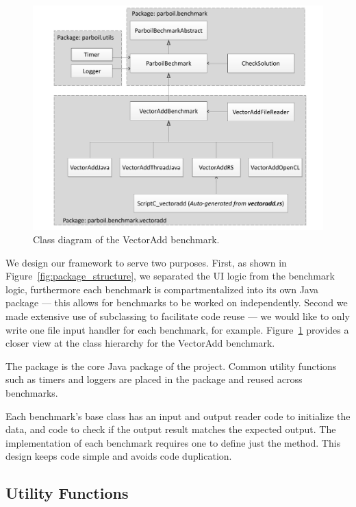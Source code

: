 \begin{figure}
\centering
\includegraphics[scale=0.3]{figs/vectoradd_class_diagram.pdf}
\caption{Class diagram of the VectorAdd benchmark.}
\label{fig:class_diagram}
\centering
\end{figure}

We design our framework to serve two purposes.
First, as shown in Figure~\ref{fig:package_structure}, we separated the UI logic from the benchmark logic, furthermore each benchmark is compartmentalized into its own Java package --- this allows for benchmarks to be worked on independently.
Second we made extensive use of subclassing to facilitate code reuse --- 
	we would like to only write one file input handler for each benchmark,
	for example.
Figure~\ref{fig:class_diagram} provides a closer
view at the class hierarchy for the VectorAdd benchmark.

The  package is the core Java package of the project.
Common utility functions such as timers and loggers are placed in the  package and reused across benchmarks.

Each benchmark's base class has an input and output reader code to
	initialize the data, and code to check if the output result matches
	the expected output.
The implementation of each benchmark requires one to define just the 
	method.
This design keeps code simple and avoids code duplication.


\subsection{Utility Functions}

